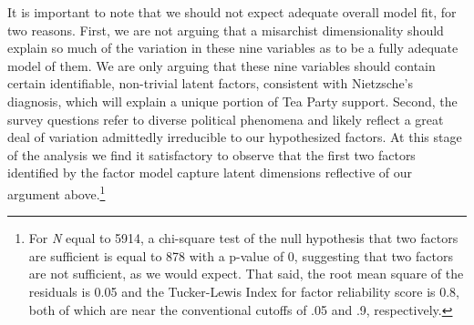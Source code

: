 \documentclass[12pt,]{article}
\let\rmarkdownfootnote\footnote%
\def\footnote{\protect\rmarkdownfootnote}
\begin{document}
It is important to note that we should not expect adequate overall model
fit, for two reasons. First, we are not arguing that a misarchist
dimensionality should explain so much of the variation in these nine
variables as to be a fully adequate model of them. We are only arguing
that these nine variables should contain certain identifiable,
non-trivial latent factors, consistent with Nietzsche's diagnosis, which
will explain a unique portion of Tea Party support. Second, the survey
questions refer to diverse political phenomena and likely reflect a
great deal of variation admittedly irreducible to our hypothesized
factors. At this stage of the analysis we find it satisfactory to
observe that the first two factors identified by the factor model
capture latent dimensions reflective of our argument above.\footnote{For
  \emph{N} equal to 5914, a chi-square test of the null hypothesis that
  two factors are sufficient is equal to 878 with a p-value of 0,
  suggesting that two factors are not sufficient, as we would expect.
  That said, the root mean square of the residuals is 0.05 and the
  Tucker-Lewis Index for factor reliability score is 0.8, both of which
  are near the conventional cutoffs of .05 and .9, respectively.}
\end{document}
